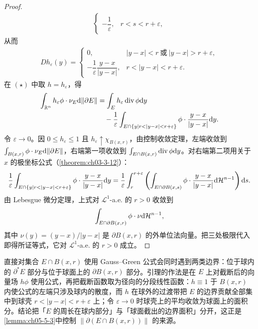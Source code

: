 \documentclass[../../main.tex]{subfiles}%
\begin{document}
\begin{proof}
\begin{align*}
\begin{cases}
-\dfrac{1}{\varepsilon}, & r<s<r+\varepsilon,
\end{cases}
\end{align*}
从而
\begin{align*}
Dh_\varepsilon(y)=
\begin{cases}
0, & \lvert y-x\rvert<r\ \text{或}\ \lvert y-x\rvert>r+\varepsilon,\\[2pt]
-\dfrac{1}{\varepsilon}\dfrac{y-x}{\lvert y-x\rvert}, & r<\lvert y-x\rvert<r+\varepsilon .
\end{cases}
\end{align*}
在 $(\star)$ 中取 $h=h_\varepsilon$，得
\begin{align*}
\int_{\mathbb{R}^n}h_\varepsilon\phi\cdot\nu_E\mathrm{d}\lVert\partial E\rVert
&=\int_E h_\varepsilon\operatorname{div}\phi\mathrm{d} y\\
&\quad-\frac{1}{\varepsilon}\int_{E\cap\{y\mid r<\lvert y-x\rvert<r+\varepsilon\}}\phi\cdot\frac{y-x}{\lvert y-x\rvert}\mathrm{d} y .
\end{align*}
令 $\varepsilon\to0$。因 $0\leqslant h_\varepsilon\leqslant1$ 且 $h_\varepsilon\uparrow\chi_{B(x,r)}$，由控制收敛定理，左端收敛到 $\int_{B(x,r)}\phi\cdot\nu_E\mathrm{d}\lVert\partial E\rVert$，右端第一项收敛到 $\int_{E\cap B(x,r)}\operatorname{div}\phi\mathrm{d} y$。对右端第二项用关于 $x$ 的极坐标公式（\cref{theorem:ch03-3-12}）：%
\begin{align*}
\frac{1}{\varepsilon}\int_{E\cap\{y\mid r<\lvert y-x\rvert<r+\varepsilon\}}\phi\cdot\frac{y-x}{\lvert y-x\rvert}\mathrm{d} y
=\frac{1}{\varepsilon}\int_r^{r+\varepsilon}\left(\int_{E\cap\partial B(x,s)}\phi\cdot\frac{y-x}{\lvert y-x\rvert}\mathrm{d}\mathcal{H}^{n-1}\right)\mathrm{d} s .
\end{align*}
由 Lebesgue 微分定理，上式对 $\mathcal{L}^1$-a.e. 的 $r>0$ 收敛到
\begin{align*}
\int_{E\cap\partial B(x,r)}\phi\cdot\nu\mathrm{d}\mathcal{H}^{n-1},
\end{align*}
其中 $\nu(y)=(y-x)/\lvert y-x\rvert$ 是 $\partial B(x,r)$ 的外单位法向量。把三处极限代入即得所证等式，它对 $\mathcal{L}^1$-a.e. 的 $r>0$ 成立。
\end{proof}

\begin{remark}\label{remark:ch05-lem-5-2-动机}
直接对集合 $E\cap B(x,r)$ 使用 Gauss--Green 公式会同时遇到两类边界：位于球内的 $\partial^*E$ 部分与位于球面上的 $\partial B(x,r)$ 部分。引理的作法是在 $E$ 上对截断后的向量场 $h\phi$ 使用公式，再把截断函数取为径向的分段线性函数：$h\equiv1$ 于 $B(x,r)$ 内使公式的左端只涉及球内的散度，而 $h$ 在球外的过渡带把 $E$ 的边界贡献全部集中到球壳 $r<\lvert y-x\rvert<r+\varepsilon$ 上；令 $\varepsilon\to0$ 时球壳上的平均收敛为球面上的面积分。结论把「$E$ 的周长在球内部分」与「球面截出的边界面积」分开，这正是\cref{lemma:ch05-5-3}中控制 $\lVert\partial(E\cap B(x,r))\rVert$ 的来源。%
\end{remark}
\end{document}
